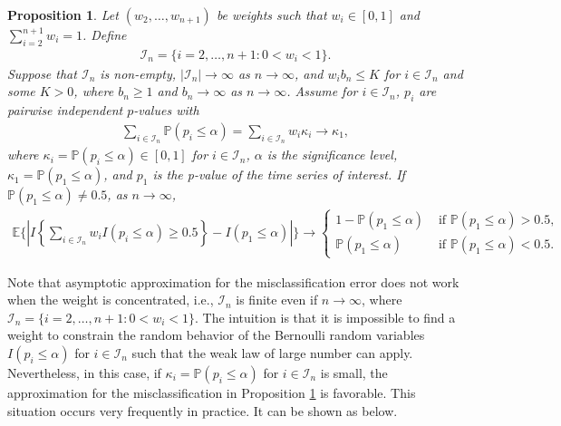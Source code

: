 \documentclass[11pt]{article}
\def\mc#1{\mathcal{#1}} %
\def\E{\mathbb{E}} %
\def\mc#1{\mathcal{#1}}
\def\P{\mathbb{P}}
\newtheorem{prop}{Proposition}
\theoremstyle{definition}
\begin{document}
\begin{prop}
\label{votprop2}Let $(w_2, \ldots, w_{n+1})$ be weights such that $w_i \in [0,1]$ and $\sum_{i=2}^{n+1} w_i=1$. Define
\begin{align*}
  \mc{I}_n = \{i =  2,\ldots, n+1\colon 0< w_i < 1\}.
\end{align*}
Suppose that  $\mc{I}_n$  is non-empty, $|\mc{I}_n| \to \infty$ as $n \to \infty$, and $w_i b_n\leq K$ for $i\in \mc{I}_n$ and some $K>0$, where $b_n \geq 1$ and $b_n \to \infty$ as $n\to \infty$. Assume for $i \in \mc{I}_n$,  $p_i$ are pairwise independent $p$-values  with 
\begin{align*}
  \sum_{i\in \mc{I}_n}\P(p_i \leq \alpha) = \sum_{i\in \mc{I}_n} w_i \kappa_i \to \kappa_{1},
\end{align*}
where $\kappa_i =  \P(p_i \leq \alpha)\in [0,1]$ for $i \in \mc{I}_n$, $\alpha$ is the significance level, $\kappa_1 = \P(p_1 \leq \alpha)$, and  $p_1$ is the p-value of the time series of interest. If $\P(p_1 \leq \alpha) \neq 0.5$, as $n\to \infty$, 
\begin{align*}
  \E \bigg\{\left|I\left\{ \sum_{i\in \mc{I}_n} w_i I(p_i \leq  \alpha) \geq 0.5\right\}
  - I( p_1 \leq  \alpha) \right|\bigg\}
  \to  \begin{cases}
    1- \P(p_1 \leq \alpha) & \text{ if } \P(p_1 \leq \alpha) > 0.5, \\
    \P(p_1 \leq \alpha) & \text{ if } \P(p_1 \leq \alpha) < 0.5. 
  \end{cases}
\end{align*}
\end{prop}



Note that asymptotic approximation for the misclassification error does not work when the weight is concentrated, i.e., $\mc{I}_n$ is finite even if $n\to \infty$, where $\mc{I}_n = \{i =  2,\ldots, n+1\colon 0< w_i < 1\}$. The intuition is that  it is impossible to find a weight to constrain the random behavior of the Bernoulli random variables $I(p_i\leq \alpha)$ for $i \in \mc{I}_n$ such that the weak law of large number can apply.  Nevertheless, in this case, if $\kappa_i = \P(p_i\leq \alpha)$ for $i\in \mc{I}_n$ is small, the approximation for the misclassification in Proposition \ref{votprop2} is favorable. This situation occurs very frequently in practice. It can be shown as below.
\end{document}
